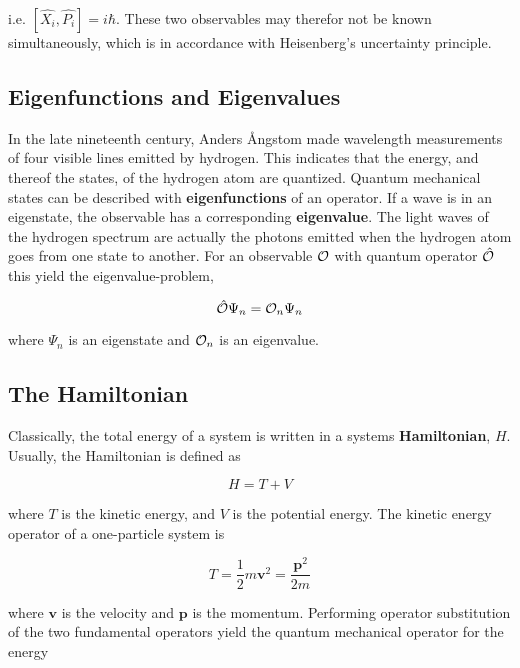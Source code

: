 i.e. $\left[ \hat{X_i}, \hat{P_i} \right] = i \hbar$. These two
observables may therefor not be known simultaneously, which is in
accordance with Heisenberg's uncertainty principle.


\subsection{Eigenfunctions and Eigenvalues}

In the late nineteenth century, Anders \AA ngstom made wavelength
measurements of four visible lines emitted by hydrogen. This indicates
that the energy, and thereof the states, of the hydrogen atom are
quantized.  Quantum mechanical states can be described with 
{\bf eigenfunctions} of an operator. If a wave is in an
eigenstate, the observable has a corresponding 
{\bf eigenvalue}. The light waves of the hydrogen spectrum are
actually the photons emitted when the hydrogen atom goes from one
state to another. For an observable ${\cal O}$ with quantum operator
$\hat{{\cal O}}$ this yield the eigenvalue-problem,

\begin{equation*}
  \hat{{\cal O}} \Psi_n = {\cal O}_n \Psi_n
\end{equation*}

where $\Psi_n$ is an eigenstate and ${\cal O}_n$ is an eigenvalue.


\subsection{The Hamiltonian}

Classically, the total energy of a system is written in a systems 
{\bf Hamiltonian}, $H$. Usually, the Hamiltonian is defined as

\begin{equation*}
  H = T + V
\end{equation*}

where $T$ is the kinetic energy, and $V$ is the potential energy. The
kinetic energy operator of a one-particle system is

\begin{equation*}
  T = \frac{1}{2}m\mathbf{v}^2 = \frac{\mathbf{p}^2}{2m}
\end{equation*}

where $\mathbf{v}$ is the velocity and $\mathbf{p}$ is the
momentum. Performing operator substitution of the two fundamental
operators yield the quantum mechanical operator for the energy

